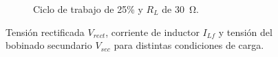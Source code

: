 \begin{figure}[h]
\begin{subfigure}{0.48\textwidth}
        \caption{Ciclo de trabajo de 25\% y $R_L$ de \SI[]{30}{\ohm}.}
        \label{fig:ensayo_concarga30V_DC25_RL30}
    \end{subfigure}
    \caption{Tensión rectificada $V_{rect}$, corriente de inductor $I_{Lf}$ y tensión del bobinado secundario $V_{sec}$ para distintas condiciones de carga.}
    \label{fig:ensayo_concarga30V}
\end{figure}

\lipsum[1]\\

\lipsum[2]\\

\lipsum[3]\\

\lipsum[4]\\